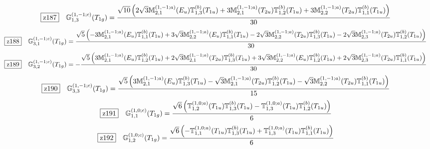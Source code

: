 \documentclass[fleqn,10pt,landscape]{jsarticle}
\begin{document}
\begin{dmath*}
\hspace*{3mm}\fbox{z187}\quad \mathbb{G}_{1,3}^{(1,-1;c)}(T_{1g})=\frac{\sqrt{10} \left(2 \sqrt{3} \mathbb{M}_{2,1}^{(1,-1;a)}(E_{u}) \mathbb{T}_{1,3}^{(b)}(T_{1u}) + 3 \mathbb{M}_{2,1}^{(1,-1;a)}(T_{2u}) \mathbb{T}_{1,2}^{(b)}(T_{1u}) + 3 \mathbb{M}_{2,2}^{(1,-1;a)}(T_{2u}) \mathbb{T}_{1,1}^{(b)}(T_{1u})\right)}{30}
\end{dmath*}
\begin{dmath*}
\hspace*{3mm}\fbox{z188}\quad \mathbb{G}_{3,1}^{(1,-1;c)}(T_{1g})=\frac{\sqrt{5} \left(- 3 \mathbb{M}_{2,1}^{(1,-1;a)}(E_{u}) \mathbb{T}_{1,1}^{(b)}(T_{1u}) + 3 \sqrt{3} \mathbb{M}_{2,2}^{(1,-1;a)}(E_{u}) \mathbb{T}_{1,1}^{(b)}(T_{1u}) - 2 \sqrt{3} \mathbb{M}_{2,2}^{(1,-1;a)}(T_{2u}) \mathbb{T}_{1,3}^{(b)}(T_{1u}) - 2 \sqrt{3} \mathbb{M}_{2,3}^{(1,-1;a)}(T_{2u}) \mathbb{T}_{1,2}^{(b)}(T_{1u})\right)}{30}
\end{dmath*}
\begin{dmath*}
\hspace*{3mm}\fbox{z189}\quad \mathbb{G}_{3,2}^{(1,-1;c)}(T_{1g})=- \frac{\sqrt{5} \left(3 \mathbb{M}_{2,1}^{(1,-1;a)}(E_{u}) \mathbb{T}_{1,2}^{(b)}(T_{1u}) + 2 \sqrt{3} \mathbb{M}_{2,1}^{(1,-1;a)}(T_{2u}) \mathbb{T}_{1,3}^{(b)}(T_{1u}) + 3 \sqrt{3} \mathbb{M}_{2,2}^{(1,-1;a)}(E_{u}) \mathbb{T}_{1,2}^{(b)}(T_{1u}) + 2 \sqrt{3} \mathbb{M}_{2,3}^{(1,-1;a)}(T_{2u}) \mathbb{T}_{1,1}^{(b)}(T_{1u})\right)}{30}
\end{dmath*}
\begin{dmath*}
\hspace*{3mm}\fbox{z190}\quad \mathbb{G}_{3,3}^{(1,-1;c)}(T_{1g})=\frac{\sqrt{5} \left(3 \mathbb{M}_{2,1}^{(1,-1;a)}(E_{u}) \mathbb{T}_{1,3}^{(b)}(T_{1u}) - \sqrt{3} \mathbb{M}_{2,1}^{(1,-1;a)}(T_{2u}) \mathbb{T}_{1,2}^{(b)}(T_{1u}) - \sqrt{3} \mathbb{M}_{2,2}^{(1,-1;a)}(T_{2u}) \mathbb{T}_{1,1}^{(b)}(T_{1u})\right)}{15}
\end{dmath*}
\begin{dmath*}
\hspace*{3mm}\fbox{z191}\quad \mathbb{G}_{1,1}^{(1,0;c)}(T_{1g})=\frac{\sqrt{6} \left(\mathbb{T}_{1,2}^{(1,0;a)}(T_{1u}) \mathbb{T}_{1,3}^{(b)}(T_{1u}) - \mathbb{T}_{1,3}^{(1,0;a)}(T_{1u}) \mathbb{T}_{1,2}^{(b)}(T_{1u})\right)}{6}
\end{dmath*}
\begin{dmath*}
\hspace*{3mm}\fbox{z192}\quad \mathbb{G}_{1,2}^{(1,0;c)}(T_{1g})=\frac{\sqrt{6} \left(- \mathbb{T}_{1,1}^{(1,0;a)}(T_{1u}) \mathbb{T}_{1,3}^{(b)}(T_{1u}) + \mathbb{T}_{1,3}^{(1,0;a)}(T_{1u}) \mathbb{T}_{1,1}^{(b)}(T_{1u})\right)}{6}
\end{dmath*}
\end{document}

